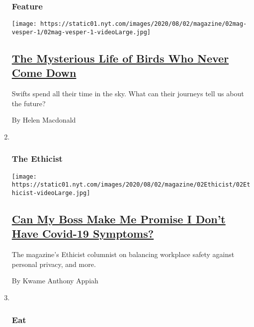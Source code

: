 \begin{enumerate}
{  \subsubsection{Feature}\label{feature-3}}

  \texttt{[image: https://static01.nyt.com/images/2020/08/02/magazine/02mag-vesper-1/02mag-vesper-1-videoLarge.jpg]}

  \hypertarget{the-mysterious-life-of-birds-who-never-come-down}{%
  \subsection{\texorpdfstring{\href{/2020/07/29/magazine/vesper-flights.html}{The
  Mysterious Life of Birds Who Never Come
  Down}}{The Mysterious Life of Birds Who Never Come Down}}\label{the-mysterious-life-of-birds-who-never-come-down}}

  Swifts spend all their time in the sky. What can their journeys tell
  us about the future?

  By Helen Macdonald
\item ~
  \hypertarget{the-ethicist-1}{%
  \subsubsection{The Ethicist}\label{the-ethicist-1}}

  \texttt{[image: https://static01.nyt.com/images/2020/08/02/magazine/02Ethicist/02Ethicist-videoLarge.jpg]}

  \hypertarget{can-my-boss-make-me-promise-i-dont-have-covid-19-symptoms}{%
  \subsection{\texorpdfstring{\href{/2020/07/28/magazine/can-my-boss-make-me-promise-i-dont-have-covid-19-symptoms.html}{Can
  My Boss Make Me Promise I Don't Have Covid-19
  Symptoms?}}{Can My Boss Make Me Promise I Don't Have Covid-19 Symptoms?}}\label{can-my-boss-make-me-promise-i-dont-have-covid-19-symptoms}}

  The magazine's Ethicist columnist on balancing workplace safety
  against personal privacy, and more.

  By Kwame Anthony Appiah
\item ~
  \hypertarget{eat}{%
  \subsubsection{Eat}\label{eat}}


\end{enumerate}
